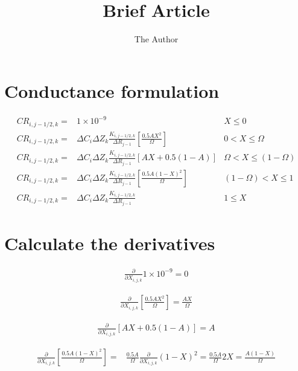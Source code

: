 \documentclass[11pt]{article} %
\title{Brief Article}
\author{The Author}
\begin{document}
\maketitle

\section{Conductance formulation}

\begin{subequations}
\begin{align}
	CR_{i,j-1/2,k} = & 1 \times 10^{-9} & X \leq 0 \\
	CR_{i,j-1/2,k} = & \Delta C_{i} \Delta Z_{k} \frac{K_{i,j-1/2,k}}{\Delta R_{j-1}} \left[ \frac{0.5AX^{2}}{\Omega} \right]  & 0 < X \leq \Omega \\
	CR_{i,j-1/2,k} = & \Delta C_{i} \Delta Z_{k} \frac{K_{i,j-1/2,k}}{\Delta R_{j-1}} \left[ AX + 0.5  \left( 1 - A \right) \right] & \Omega < X \leq (1 - \Omega )\\
	CR_{i,j-1/2,k} = & \Delta C_{i} \Delta Z_{k} \frac{K_{i,j-1/2,k}}{\Delta R_{j-1}} \left[ \frac{0.5A \left( 1- X \right)^{2}}{\Omega} \right]  & (1 - \Omega) < X \leq 1 \\
	CR_{i,j-1/2,k} = & \Delta C_{i} \Delta Z_{k} \frac{K_{i,j-1/2,k}}{\Delta R_{j-1}} & 1 \leq X
	\label{eq:conductance}
\end{align}
\end{subequations}

\section{Calculate the derivatives}

\begin{align}
	\frac{\partial}{\partial X_{i,j,k}} 1 \times 10^{-9} = 0
	\label{eq:deriv1}
\end{align}

\begin{align}
	\frac{\partial}{\partial X_{i,j,k}} \left[ \frac{0.5AX^{2}}{\Omega} \right] = \frac{AX}{\Omega}
	\label{eq:deriv2}
\end{align}

\begin{align}
	\frac{\partial}{\partial X_{i,j,k}} \left[ AX + 0.5  \left( 1 - A \right) \right] = A
	\label{eq:deriv3}
\end{align}

\begin{align}
	\frac{\partial}{\partial X_{i,j,k}} \left[ \frac{0.5A \left( 1- X \right)^{2}}{\Omega} \right] = & \frac{0.5A}{\Omega} \frac{\partial}{\partial X_{i,j,k}} \left(1 - X \right)^{2} = \frac{0.5A}{\Omega} 2X = \frac{A \left( 1 - X \right) }{\Omega}
	\label{eq:deriv4}
\end{align}
\end{document}
